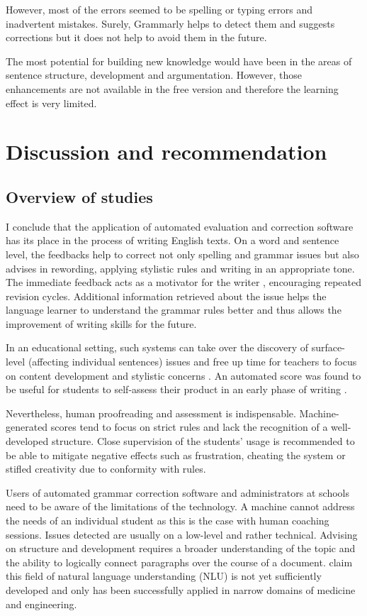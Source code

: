 \documentclass[runningheads]{llncs}
\let\OldTextregistered\textregistered
\renewcommand{\textregistered}{\OldTextregistered\xspace}
\begin{document}
However, most of the errors seemed to be spelling or typing errors and inadvertent mistakes. Surely, Grammarly\textregistered helps to detect them and suggests corrections but it does not help to avoid them in the future.

The most potential for building new knowledge would have been in the areas of sentence structure, development and argumentation. However, those enhancements are not available in the free version and therefore the learning effect is very limited.

\section{Discussion and recommendation}
\subsection{Overview of studies}
I conclude that the application of automated evaluation and correction software has its place in the process of writing English texts. On a word and sentence level, the feedbacks help to correct not only spelling and grammar issues but also advises in rewording, applying stylistic rules and writing in an appropriate tone. The immediate feedback acts as a motivator for the writer \citep{grimes_utility_2010}, encouraging repeated revision cycles. Additional information retrieved about the issue helps the language learner to understand the grammar rules better and thus allows the improvement of writing skills for the future. 

In an educational setting, such systems can take 
over the discovery of surface-level (affecting individual sentences) issues and free up time for teachers to focus on content development and stylistic concerns \citep{dembsey_closing_2017}. An automated score was found to be useful for students to self-assess their product in an early phase of writing \citep{grimes_utility_2010}. 

Nevertheless, human proofreading and assessment is indispensable. Machine-generated scores tend to focus on strict rules and lack the recognition of a well-developed structure. Close supervision of the students' usage is recommended to be able to mitigate negative effects such as frustration, cheating the system or stifled creativity due to conformity with rules.

Users of automated grammar correction software and administrators at schools need to be aware of the limitations of the technology. A machine cannot address the needs of an individual student as this is the case with human coaching sessions. Issues detected are usually on a low-level and rather technical. Advising on structure and development requires a broader understanding of the topic and the ability to logically connect paragraphs over the course of a document. \textcite{grimes_utility_2010} claim this field of natural language understanding (NLU) is not yet sufficiently developed and only has been successfully applied in narrow domains of medicine and engineering.
\end{document}
